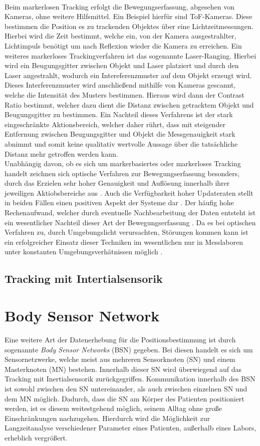 \\Beim markerlosen Tracking erfolgt die Bewegungserfassung, abgesehen von Kameras, ohne weitere Hilfsmittel. Ein Beispiel hierfür sind ToF-Kameras. Diese bestimmen die Position es zu trackenden Objektes über eine Lichtzeitmessungen. Hierbei wird die Zeit bestimmt, welche ein, von der Kamera ausgestrahlter, Lichtimpuls benötigt um nach Reflexion wieder die Kamera zu erreichen. \cite{basler}
Ein weiteres markerloses Trackingverfahren ist das sogenannte Laser-Ranging. Hierbei wird ein Beugungsgitter zwischen Objekt und Laser platziert und durch den Laser angestrahlt, wodurch ein Intereferenzmuster auf dem Objekt erzeugt wird. Dieses Interferenzmuster wird anschließend mithilfe von Kameras gescannt, welche die Intensität des Musters bestimmen. Hieraus wird dann der Contrast Ratio bestimmt, welcher dazu dient die Distanz zwischen getracktem Objekt und Beugungsgitter zu bestimmen. Ein Nachteil dieses Verfahrens ist der stark eingeschränkte Aktionsbereich, welcher daher rührt, dass mit steigender Entfernung zwischen Beugungsgitter und Objekt die Messgenauigkeit stark abnimmt und somit keine qualitativ wertvolle Aussage über die tatsächliche Distanz mehr getroffen werden kann. \cite{P25}
\\Unabhängig davon, ob es sich um markerbasiertes oder markerloses Tracking handelt zeichnen sich optische Verfahren zur Bewegungserfassung besonders, durch das Erzielen sehr hoher Genauigkeit und Auflösung innerhalb ihrer jeweiligen Aktiobsbereiche aus \cite{P24}. Auch die Verfügbarkeit hoher Updateraten stellt in beiden Fällen einen positiven Aspekt der Systeme dar \cite{P25}.
Der häufig hohe Rechenaufwand, welcher durch eventuelle Nachbearbeitung der Daten entsteht ist ein wesentlicher Nachteil dieser Art der Bewegungserfassung \cite{optsys1}. Da es bei optischen Verfahren zu, durch Umgebungslicht verursachten, Störungen kommen kann ist ein erfolgreicher Einsatz dieser Techniken im wesentlichen nur in Messlaboren unter konstanten Umgebungsverhätnissen möglich \cite{P25}.
\subsection{Tracking mit Intertialsensorik}


\section{Body Sensor Network}
Eine weitere Art der Datenerhebung für die Positionsbestimmung ist durch sogenannte \textit{Body Sensor Networks} (BSN) gegeben.
Bei diesen handelt es sich um Sensornetzwerke, welche meist aus mehreren Sensorknoten (SN) und einem Masterknoten (MN) bestehen.
Innerhalb dieser SN wird überwiegend auf das Tracking mit Inertialsensorik zurückgegriffen.
Kommunikation innerhalb des BSN ist sowohl zwischen den SN untereinander, als auch zwischen einzelnen SN und dem MN möglich.
Dadurch, dass die SN am Körper des Patienten positioniert werden, ist es diesem weitestgehend möglich, seinem Alltag ohne große Einschränkungen nachzugehen.
Hierdurch wird die Möglichkeit zur Langzeitanalyse verschiedener Parameter eines Patienten, außerhalb eines Labors, erheblich vergrößert.
